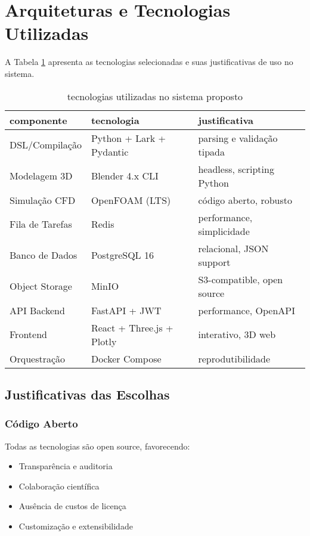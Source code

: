 \section{Arquiteturas e Tecnologias Utilizadas}

A Tabela \ref{tab:tecnologias_sistema} apresenta as tecnologias selecionadas e suas justificativas de uso no sistema.

\begin{table}[htb]
\centering
\caption{tecnologias utilizadas no sistema proposto}
\label{tab:tecnologias_sistema}
\begin{tabular}{lll}
\toprule
\textbf{componente} & \textbf{tecnologia} & \textbf{justificativa} \\
\midrule
DSL/Compilação & Python + Lark + Pydantic & parsing e validação tipada \\
Modelagem 3D & Blender 4.x CLI & headless, scripting Python \\
Simulação CFD & OpenFOAM (LTS) & código aberto, robusto \\
Fila de Tarefas & Redis & performance, simplicidade \\
Banco de Dados & PostgreSQL 16 & relacional, JSON support \\
Object Storage & MinIO & S3-compatible, open source \\
API Backend & FastAPI + JWT & performance, OpenAPI \\
Frontend & React + Three.js + Plotly & interativo, 3D web \\
Orquestração & Docker Compose & reprodutibilidade \\
\bottomrule
\end{tabular}
\end{table}

\subsection{Justificativas das Escolhas}

\subsubsection{Código Aberto}

Todas as tecnologias são open source, favorecendo:
\begin{itemize}
    \item Transparência e auditoria
    \item Colaboração científica
    \item Ausência de custos de licença
    \item Customização e extensibilidade
\end{itemize}

